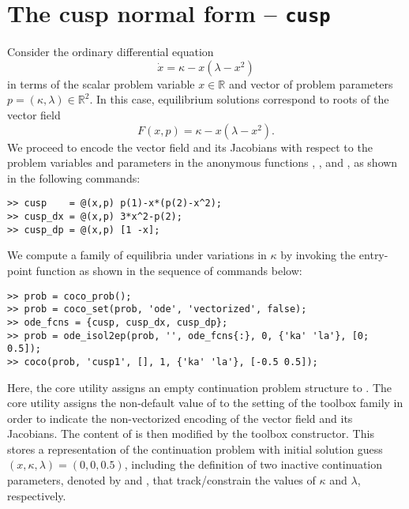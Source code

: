\section{The cusp normal form -- \texttt{cusp}}
Consider the ordinary differential equation
\begin{equation}
\dot{x}=\kappa-x\left(\lambda-x^2\right)
\end{equation}
in terms of the scalar problem variable $x\in\mathbb{R}$ and vector of problem parameters $p=(\kappa,\lambda)\in\mathbb{R}^2$. In this case, equilibrium solutions correspond to roots of the vector field
\begin{equation}
F(x,p)=\kappa-x\left(\lambda-x^2\right).
\end{equation}
We proceed to encode the vector field and its Jacobians with respect to the problem variables and parameters in the anonymous functions , , and , as shown in the following commands:
\begin{lstlisting}[language=coco-highlight]
>> cusp    = @(x,p) p(1)-x*(p(2)-x^2);
>> cusp_dx = @(x,p) 3*x^2-p(2);
>> cusp_dp = @(x,p) [1 -x];
\end{lstlisting}

We compute a family of equilibria under variations in $\kappa$ by invoking the  entry-point function as shown in the sequence of commands below:
\begin{lstlisting}[language=coco-highlight]
>> prob = coco_prob();
>> prob = coco_set(prob, 'ode', 'vectorized', false);
>> ode_fcns = {cusp, cusp_dx, cusp_dp};
>> prob = ode_isol2ep(prob, '', ode_fcns{:}, 0, {'ka' 'la'}, [0; 0.5]);
>> coco(prob, 'cusp1', [], 1, {'ka' 'la'}, [-0.5 0.5]);
\end{lstlisting}
Here, the  core utility assigns an empty continuation problem structure to . The  core utility assigns the non-default value of  to the  setting of the  toolbox family in order to indicate the non-vectorized encoding of the vector field and its Jacobians. The content of  is then modified by the  toolbox constructor. This stores a representation of the continuation problem with initial solution guess $(x,\kappa,\lambda)=(0,0,0.5)$, including the definition of two inactive continuation parameters, denoted by  and , that track/constrain the values of $\kappa$ and $\lambda$, respectively.

